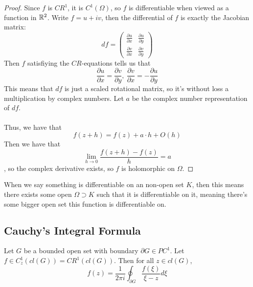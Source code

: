 \begin{proof}
Since $f$ is $CR^1$, it is $C^1(\Omega)$, so $f$ is differentiable when viewed as a function in $\mathbb{R}^2$. Write $f = u + iv$, then the differential of $f$ is exactly the Jacobian matrix:
\[df = \begin{pmatrix} \frac{\partial u}{\partial x} & \frac{\partial u}{\partial y}\\
\frac{\partial v}{\partial x} & \frac{\partial v}{\partial y} \end{pmatrix}\]
Then $f$ satisfiying the $CR$-equations tells us that
\[\frac{\partial u}{\partial x} = \frac{\partial v}{\partial y},\ \frac{\partial v}{\partial x} = -\frac{\partial u}{\partial y}\]
This means that $df$ is just a scaled rotational matrix, so it's without loss a multiplication by complex numbers. Let $a$ be the complex number representation of $df$.\\\\
Thus, we have that
\[f(z + h) = f(z) + a \cdot h + O(h)\]
Then we have that
\[\lim_{h \to 0} \frac{f(z + h) - f(z)}{h} = a\]
, so the complex derivative exists, so $f$ is holomorphic on $\Omega$.
\end{proof}

When we say something is differentiable on an non-open set $K$, then this means there exists some open $\Omega \supset K$ such that it is differentiable on it, meaning there's some bigger open set this function is differentiable on.

\subsection{Cauchy's Integral Formula}

\begin{theorem}
Let $G$ be a bounded open set with boundary $\partial G \in PC^1$. Let $f \in C^1_z(cl(G)) = CR^1(cl(G))$. Then for all $z \in cl(G)$,
\[f(z) = \frac{1}{2 \pi i} \oint_{\partial G} \frac{f(\xi)}{\xi - z} d\xi\]
\end{theorem}

